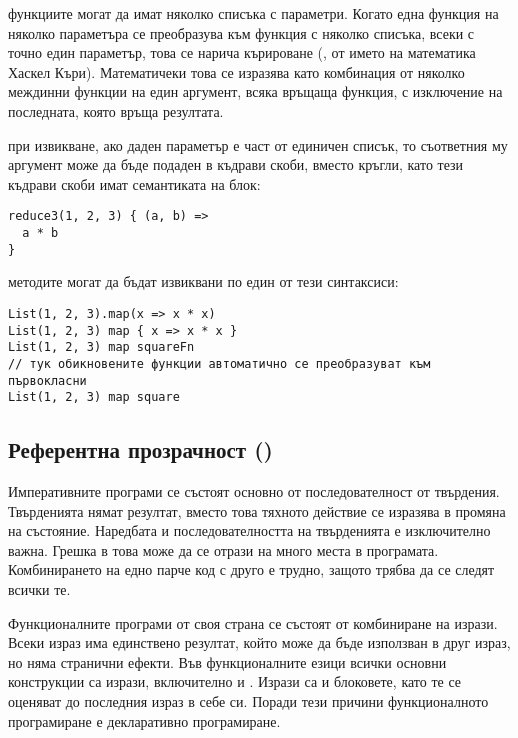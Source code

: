 \begin{itemize*}
  \item функциите могат да имат няколко списъка с параметри. Когато една функция на няколко параметъра се преобразува към функция с няколко списъка, всеки с точно един параметър, това се нарича кърироване (, от името на математика Хаскел Къри). Математичеки това се изразява като комбинация от няколко междинни функции на един аргумент, всяка връщаща функция, с изключение на последната, която връща резултата.
  
  \item при извикване, ако даден параметър е част от единичен списък, то съответния му аргумент може да бъде подаден в къдрави скоби, вместо кръгли, като тези къдрави скоби имат семантиката на блок:
  
  \begin{lstlisting}
reduce3(1, 2, 3) { (a, b) =>
  a * b
}
  \end{lstlisting}
  
  \item методите могат да бъдат извиквани по един от тези синтаксиси:
  
  \begin{lstlisting}[texcl=true]
List(1, 2, 3).map(x => x * x)
List(1, 2, 3) map { x => x * x }
List(1, 2, 3) map squareFn
// тук обикновените функции автоматично се преобразуват към първокласни
List(1, 2, 3) map square
  \end{lstlisting}
\end{itemize*}

\subsection{Референтна прозрачност ()}

Императивните програми се състоят основно от последователност от твърдения. Твърденията нямат резултат, вместо това тяхното действие се изразява в промяна на състояние. Наредбата и последователността на твърденията е изключително важна. Грешка в това може да се отрази на много места в програмата. Комбинирането на едно парче код с друго е трудно, защото трябва да се следят всички те.

Функционалните програми от своя страна се състоят от комбиниране на изрази. Всеки израз има единствено резултат, който може да бъде използван в друг израз, но няма странични ефекти. Във функционалните езици всички основни конструкции са изрази, включително  и . Изрази са и блоковете, като те се оценяват до последния израз в себе си. Поради тези причини функционалното програмиране е декларативно програмиране.


